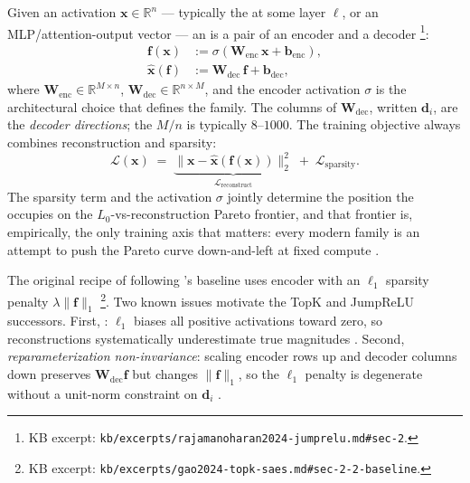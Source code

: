 Given an activation $\mathbf{x} \in \mathbb{R}^n$ — typically the
 at some layer $\ell$, or an MLP/attention-output vector
— an  is a pair of an encoder and a decoder
\citep[\S 2, Eq.~1--2]{rajamanoharan2024-jumprelu}\footnote{KB excerpt:
\nolinkurl{kb/excerpts/rajamanoharan2024-jumprelu.md#sec-2}.}:
\begin{align}
  \mathbf{f}(\mathbf{x}) &:= \sigma\!\left(\mathbf{W}_{\text{enc}}\,\mathbf{x} + \mathbf{b}_{\text{enc}}\right),
  \label{eq:sae-encoder}\\
  \hat{\mathbf{x}}(\mathbf{f}) &:= \mathbf{W}_{\text{dec}}\,\mathbf{f} + \mathbf{b}_{\text{dec}},
  \label{eq:sae-decoder}
\end{align}
where $\mathbf{W}_{\text{enc}} \in \mathbb{R}^{M \times n}$,
$\mathbf{W}_{\text{dec}} \in \mathbb{R}^{n \times M}$, and the encoder
activation $\sigma$ is the architectural choice that defines the 
family. The columns of $\mathbf{W}_{\text{dec}}$, written
$\mathbf{d}_i$, are the \emph{decoder  directions}; the
 $M / n$ is typically $8$--$1000$. The training
objective always combines reconstruction and sparsity:
\begin{equation}
  \mathcal{L}(\mathbf{x})
  \;=\;
  \underbrace{\|\mathbf{x} - \hat{\mathbf{x}}(\mathbf{f}(\mathbf{x}))\|_2^2}_{\mathcal{L}_{\text{reconstruct}}}
  \;+\;
  \mathcal{L}_{\text{sparsity}}.
  \label{eq:sae-loss}
\end{equation}
The sparsity term and the activation $\sigma$ jointly determine the
position the  occupies on the $L_0$-vs-reconstruction Pareto
frontier, and that frontier is, empirically, the only training axis
that matters: every modern  family is an attempt to push the
Pareto curve down-and-left at fixed compute
\citep[\S 1]{rajamanoharan2024-jumprelu}.

The original recipe of \citet{templeton2024-scaling-monosemanticity}
following \citet{gao2024-topk-saes}'s baseline uses  encoder with
an $\ell_1$ sparsity penalty $\lambda \|\mathbf{f}\|_1$
\citep[\S 2.2, Eq.~1]{gao2024-topk-saes}\footnote{KB excerpt:
\nolinkurl{kb/excerpts/gao2024-topk-saes.md#sec-2-2-baseline}.}. Two
known issues motivate the TopK and JumpReLU successors. First,
\emph{}: $\ell_1$ biases all positive activations toward zero,
so reconstructions systematically underestimate true 
magnitudes \citep[\S 2.3]{gao2024-topk-saes}. Second,
\emph{reparameterization non-invariance}: scaling encoder rows up and
decoder columns down preserves $\mathbf{W}_{\text{dec}}\mathbf{f}$ but
changes $\|\mathbf{f}\|_1$, so the $\ell_1$ penalty is degenerate
without a unit-norm constraint on $\mathbf{d}_i$
\citep[\S 3]{rajamanoharan2024-jumprelu}.

